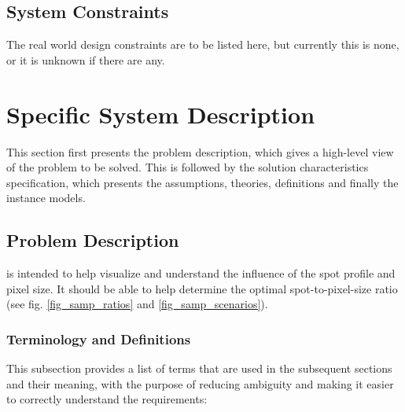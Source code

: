 \documentclass[12pt]{article}
\begin{document}
\subsection{System Constraints}

The real world design constraints are to be listed here, but currently this is none, or it is unknown if there are any.

\section{Specific System Description}

This section first presents the problem description, which gives a high-level
view of the problem to be solved.  This is followed by the solution characteristics
specification, which presents the assumptions, theories, definitions and finally
the instance models.

\subsection{Problem Description} \label{Sec_pd}

\progname{} is intended to help visualize and understand the influence of the 
spot profile and pixel size. It should be able to help determine the optimal 
spot-to-pixel-size ratio (see fig. \ref{fig_samp_ratios} and \ref{fig_samp_scenarios}).

\subsubsection{Terminology and Definitions}

This subsection provides a list of terms that are used in the subsequent
sections and their meaning, with the purpose of reducing ambiguity and making it
easier to correctly understand the requirements:
\end{document}
